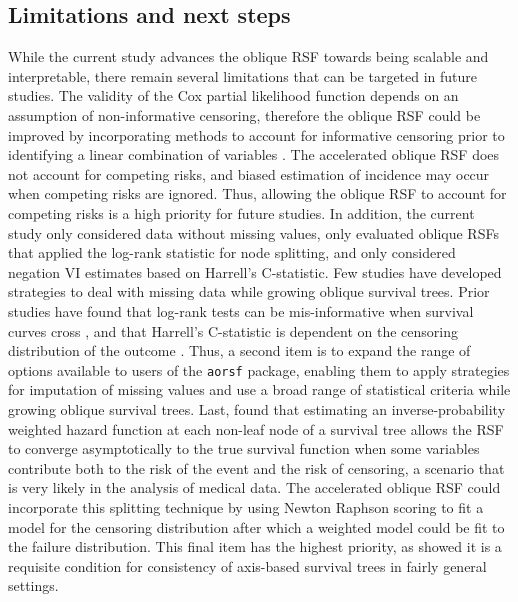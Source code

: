\documentclass[12pt]{article}\usepackage[]{graphicx}\usepackage[]{xcolor}
\begin{document}
\subsection{Limitations and next steps}

While the current study advances the oblique RSF towards being scalable and interpretable, there remain several limitations that can be targeted in future studies. The validity of the Cox partial likelihood function depends on an assumption of non-informative censoring, therefore the oblique RSF could be improved by incorporating methods to account for informative censoring prior to identifying a linear combination of variables \citep{he2016proportional, cui2017consistency}.  The accelerated oblique RSF does not account for competing risks, and biased estimation of incidence may occur when competing risks are ignored. Thus, allowing the oblique RSF to account for competing risks is a high priority for future studies. In addition, the current study only considered data without missing values, only evaluated oblique RSFs that applied the log-rank statistic for node splitting, and only considered negation VI estimates based on Harrell's C-statistic. Few studies have developed strategies to deal with missing data while growing oblique survival trees. Prior studies have found that log-rank tests can be mis-informative when survival curves cross \citep{li2015statistical}, and that Harrell's C-statistic is dependent on the censoring distribution of the outcome \citep{uno2011c}. Thus, a second item is to expand the range of options available to users of the \texttt{aorsf} package, enabling them to apply strategies for imputation of missing values and use a broad range of statistical criteria while growing oblique survival trees. Last, \citet{cui2017consistency} found that estimating an inverse-probability weighted hazard function at each non-leaf node of a survival tree allows the RSF to converge asymptotically to the true survival function when some variables contribute both to the risk of the event and the risk of censoring, a scenario that is very likely in the analysis of medical data. The accelerated oblique RSF could incorporate this splitting technique by using Newton Raphson scoring to fit a model for the censoring distribution after which a weighted model could be fit to the failure distribution. This final item has the highest priority, as \citet{cui2017consistency} showed it is a requisite condition for consistency of axis-based survival trees in fairly general settings.

\end{document}
